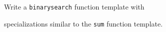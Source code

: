 Write a \texttt{binarysearch} function template with

specializations similar to the \texttt{sum} function template.

